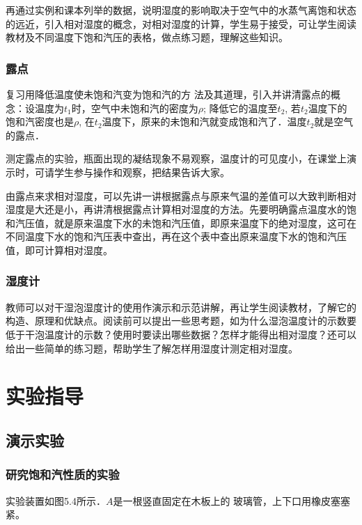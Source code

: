 再通过实例和课本列举的数据，说明湿度的影响取决于空气中的水蒸气离饱和状态的远近，引入相对湿度的概念，对相对湿度的计算，学生易于接受，可让学生阅读教材及不同温度下饱和汽压的表格，做点练习题，理解这些知识。

\subsubsection{露点}

复习用降低温度使未饱和汽变为饱和汽的方
法及其道理，引入并讲清露点的概念：设温度为$t_1$时，空气中未饱和汽的密度为$\rho$; 降低它的温度至$t_2$, 若$t_2$温度下的饱和汽密度也是$\rho$, 在$t_2$温度下，原来的未饱和汽就变成饱和汽了．温度$t_2$就是空气的露点．

测定露点的实验，瓶面出现的凝结现象不易观察，温度计的可见度小，在课堂上演示时，可请学生参与操作和观察，把结果告诉大家。

由露点来求相对湿度，可以先讲一讲根据露点与原来气温的差值可以大致判断相对湿度是大还是小，再讲清根据露点计算相对湿度的方法。先要明确露点温度水的饱和汽压值，就是原来温度下水的未饱和汽压值，即原来温度下的绝对湿度，这可在不同温度下水的饱和汽压表中查出，再在这个表中查出原来温度下水的饱和汽压值，即可计算相对湿度。

\subsubsection{湿度计}

教师可以对干湿泡湿度计的使用作演示和示范讲解，再让学生阅读教材，了解它的构造、原理和优缺点。阅读前可以提出一些思考题，如为什么湿泡温度计的示数要低于干泡温度计的示数？使用时要读出哪些数据？怎样才能得出相对湿度？还可以给出一些简单的练习题，帮助学生了解怎样用湿度计测定相对湿度。

\section{实验指导}
\subsection{演示实验}
\subsubsection{研究饱和汽性质的实验}

实验装置如图5.4所示．$A$是一根竖直固定在木板上的
玻璃管，上下口用橡皮塞塞紧。
\begin{figure}[htp]
    \centering
    \caption{}
\end{figure}


